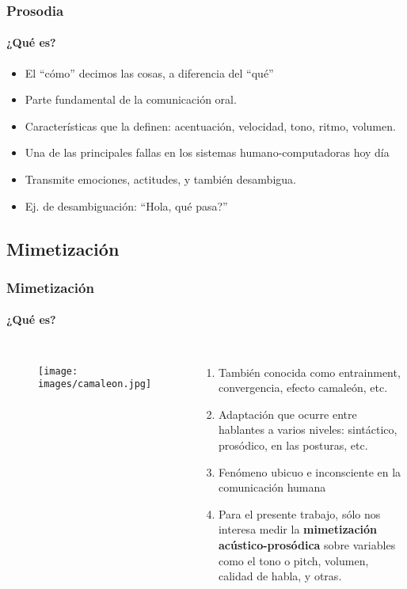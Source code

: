 \begin{frame}
  \frametitle{Prosodia}
  \framesubtitle{¿Qué es?}
  \begin{itemize}
    \item El ``cómo'' decimos las cosas, a diferencia del ``qué''
    \item Parte fundamental de la comunicación oral.
    \item Características que la definen: acentuación, velocidad, tono, ritmo, volumen.
    \item Una de las principales fallas en los sistemas humano-computadoras hoy día
    \item Transmite emociones, actitudes, y también desambigua.
    \item Ej. de desambiguación: ``Hola, qué pasa?''
  \end{itemize}

  \vfill
\end{frame}


\subsection{Mimetización}

\begin{frame}
  \frametitle{Mimetización}
  \framesubtitle{¿Qué es?}
  \begin{columns}
    \begin{figure}
      \texttt{[image: images/camaleon.jpg]}
    \end{figure}

  \begin{enumerate}
    \item También conocida como entrainment, convergencia, efecto camaleón, etc.
    \item Adaptación que ocurre entre hablantes a varios niveles: sintáctico, prosódico, en las posturas, etc.
    \item Fenómeno ubicuo e inconsciente en la comunicación humana
    \item Para el presente trabajo, sólo nos interesa medir la \textbf{mimetización acústico-prosódica} sobre variables como el tono o pitch, volumen, calidad de habla, y otras.

  \end{enumerate}

  \end{columns}

\end{frame}

